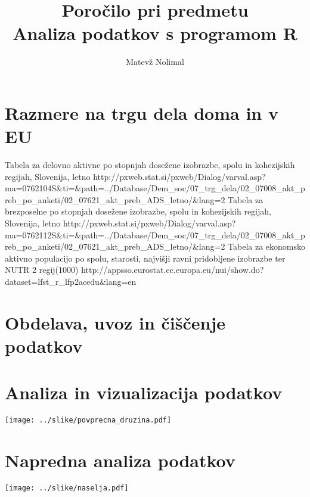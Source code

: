 \documentclass[11pt,a4paper]{article}
\begin{document}
\title{Poročilo pri predmetu \\
Analiza podatkov s programom R}
\author{Matevž Nolimal}
\maketitle

\section{Razmere na trgu dela doma in v EU}
Tabela za delovno aktivne po stopnjah dosežene izobrazbe, spolu in kohezijskih regijah, Slovenija, letno\:\n
http://pxweb.stat.si/pxweb/Dialog/varval.asp?ma=0762104S&ti=&path=../Database/Dem_soc/07_trg_dela/02_07008_akt_preb_po_anketi/02_07621_akt_preb_ADS_letno/&lang=2\n
Tabela za brezposelne po stopnjah dosežene izobrazbe, spolu in kohezijskih regijah, Slovenija, letno\:\n
http://pxweb.stat.si/pxweb/Dialog/varval.asp?ma=0762112S&ti=&path=../Database/Dem_soc/07_trg_dela/02_07008_akt_preb_po_anketi/02_07621_akt_preb_ADS_letno/&lang=2\n
Tabela za ekonomsko aktivno populacijo po spolu, starosti, najvišji ravni pridobljene izobrazbe ter NUTR 2 regij(1000)\:\n
http://appsso.eurostat.ec.europa.eu/nui/show.do?dataset=lfst_r_lfp2acedu&lang=en\n

\section{Obdelava, uvoz in čiščenje podatkov}

\section{Analiza in vizualizacija podatkov}

\texttt{[image: ../slike/povprecna\_druzina.pdf]}

\section{Napredna analiza podatkov}

\texttt{[image: ../slike/naselja.pdf]}
\end{document}
